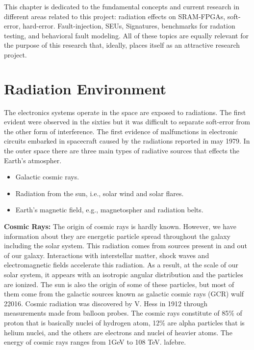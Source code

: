 

This chapter is dedicated to the fundamental concepts and current research in different areas related to this project: radiation effects on SRAM-FPGAs, soft-error, hard-error. Fault-injection, SEUs, Signatures, benchmarks for radation testing, and behavioral fault modeling. All of these topics are equally relevant for the purpose of this research that, ideally, places itself as an attractive research project.



\section{Radiation Environment}


The electronics systems operate in the space are exposed to radiations. The first evident were observed in the sixties but it was difficult to separate soft-error from the other form of interference. The first evidence of malfunctions in electronic circuits embarked in spacecraft caused by the radiations reported in may 1979. In the outer space there are three main types of radiative sources that effects the Earth's atmospher.

\begin{itemize}

\item Galactic cosmic rays.

\item Radiation from the sun, i.e., solar wind and solar flares.

\item Earth's magnetic field, e.g., magnetospher and radiation belts.

\end{itemize}


\textbf{Cosmic Rays:} The origin of cosmic rays is hardly known. However, we have information about they are energetic particle spread throughout the galaxy including the solar system. This radiation comes from sources present in and out of our
galaxy. Interactions with interstellar matter, shock waves and 
electromagnetic fields accelerate this radiation. As a result, at the scale of our
solar system, it appears with an isotropic angular distribution and the particles are ionized. The sun is also the origin of some of these particles, but most of them come from the galactic sources known as galactic cosmic rays (GCR) wulf 22016.
Cosmic radiation was discovered by V. Hess in 1912 through measurements made from balloon probes. The cosmic rays constitute of 85\% of proton that is basically nuclei of hydrogen atom, 12\% are alpha particles that is helium nuclei, and the others are electrons and nuclei of heavier atoms. The energy of cosmic rays ranges from 1GeV to 108 TeV. lafebre.


